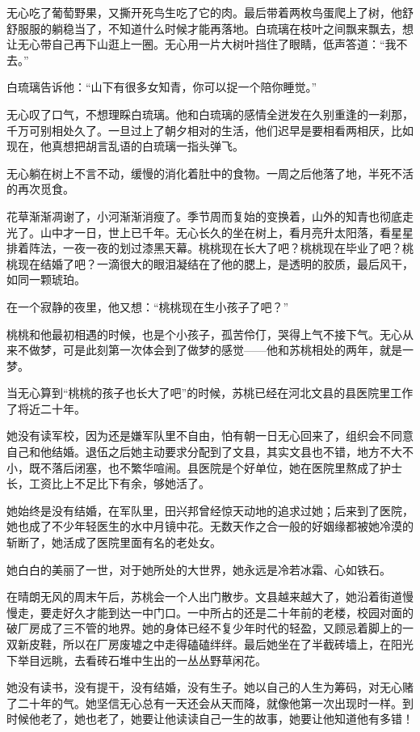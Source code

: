 无心吃了葡萄野果，又撕开死鸟生吃了它的肉。最后带着两枚鸟蛋爬上了树，他舒舒服服的躺稳当了，不知道什么时候才能再落地。白琉璃在枝叶之间飘来飘去，想让无心带自己再下山逛上一圈。无心用一片大树叶挡住了眼睛，低声答道：``我不去。''

白琉璃告诉他：``山下有很多女知青，你可以捉一个陪你睡觉。''

无心叹了口气，不想理睬白琉璃。他和白琉璃的感情全迸发在久别重逢的一刹那，千万可别相处久了。一旦过上了朝夕相对的生活，他们迟早是要相看两相厌，比如现在，他真想把胡言乱语的白琉璃一指头弹飞。

无心躺在树上不言不动，缓慢的消化着肚中的食物。一周之后他落了地，半死不活的再次觅食。

花草渐渐凋谢了，小河渐渐消瘦了。季节周而复始的变换着，山外的知青也彻底走光了。山中才一日，世上已千年。无心长久的坐在树上，看月亮升太阳落，看星星排着阵法，一夜一夜的划过漆黑天幕。桃桃现在长大了吧？桃桃现在毕业了吧？桃桃现在结婚了吧？一滴很大的眼泪凝结在了他的腮上，是透明的胶质，最后风干，如同一颗琥珀。

在一个寂静的夜里，他又想：``桃桃现在生小孩子了吧？''

桃桃和他最初相遇的时候，也是个小孩子，孤苦伶仃，哭得上气不接下气。无心从来不做梦，可是此刻第一次体会到了做梦的感觉——他和苏桃相处的两年，就是一梦。

当无心算到``桃桃的孩子也长大了吧''的时候，苏桃已经在河北文县的县医院里工作了将近二十年。

她没有读军校，因为还是嫌军队里不自由，怕有朝一日无心回来了，组织会不同意自己和他结婚。退伍之后她主动要求分配到了文县，其实文县也不错，地方不大不小，既不落后闭塞，也不繁华喧闹。县医院是个好单位，她在医院里熬成了护士长，工资比上不足比下有余，够她活了。

她始终是没有结婚，在军队里，田兴邦曾经惊天动地的追求过她；后来到了医院，她也成了不少年轻医生的水中月镜中花。无数天作之合一般的好姻缘都被她冷漠的斩断了，她活成了医院里面有名的老处女。

她白白的美丽了一世，对于她所处的大世界，她永远是冷若冰霜、心如铁石。

在晴朗无风的周末午后，苏桃会一个人出门散步。文县越来越大了，她沿着街道慢慢走，要走好久才能到达一中门口。一中所占的还是二十年前的老楼，校园对面的破厂房成了三不管的地界。她的身体已经不复少年时代的轻盈，又顾忌着脚上的一双新皮鞋，所以在厂房废墟之中走得磕磕绊绊。最后她坐在了半截砖墙上，在阳光下举目远眺，去看砖石堆中生出的一丛丛野草闲花。

她没有读书，没有提干，没有结婚，没有生子。她以自己的人生为筹码，对无心赌了二十年的气。她坚信无心总有一天还会从天而降，就像他第一次出现时一样。到时候他老了，她也老了，她要让他读读自己一生的故事，她要让他知道他有多错！

